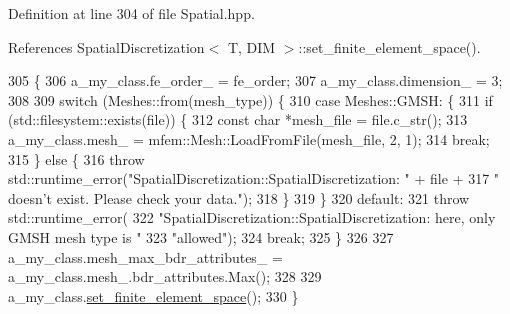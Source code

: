 Definition at line 304 of file Spatial.\+hpp.



References Spatial\+Discretization$<$ T, D\+I\+M $>$\+::set\+\_\+finite\+\_\+element\+\_\+space().


\begin{DoxyCode}
305                                                               \{
306     a\_my\_class.fe\_order\_ = fe\_order;
307     a\_my\_class.dimension\_ = 3;
308 
309     \textcolor{keywordflow}{switch} (Meshes::from(mesh\_type)) \{
310       \textcolor{keywordflow}{case} Meshes::GMSH: \{
311         \textcolor{keywordflow}{if} (std::filesystem::exists(file)) \{
312           \textcolor{keyword}{const} \textcolor{keywordtype}{char} *mesh\_file = file.c\_str();
313           a\_my\_class.mesh\_ = mfem::Mesh::LoadFromFile(mesh\_file, 2, 1);
314           \textcolor{keywordflow}{break};
315         \} \textcolor{keywordflow}{else} \{
316           \textcolor{keywordflow}{throw} std::runtime\_error(\textcolor{stringliteral}{"SpatialDiscretization::SpatialDiscretization: "} + file +
317                                    \textcolor{stringliteral}{" doesn't exist. Please check your data."});
318         \}
319       \}
320       \textcolor{keywordflow}{default}:
321         \textcolor{keywordflow}{throw} std::runtime\_error(
322             \textcolor{stringliteral}{"SpatialDiscretization::SpatialDiscretization: here, only GMSH mesh type is "}
323             \textcolor{stringliteral}{"allowed"});
324         \textcolor{keywordflow}{break};
325     \}
326 
327     a\_my\_class.mesh\_max\_bdr\_attributes\_ = a\_my\_class.mesh\_.bdr\_attributes.Max();
328 
329     a\_my\_class.\hyperlink{classSpatialDiscretization_a8400a265a094312b4d57708d44f9d627}{set\_finite\_element\_space}();
330   \}
\end{DoxyCode}
\mbox{\label{structspecialized__spatial__constructor_3_01T_00_013_01_4_ac78f53b20f83db96a72397d6f9048500}} 
